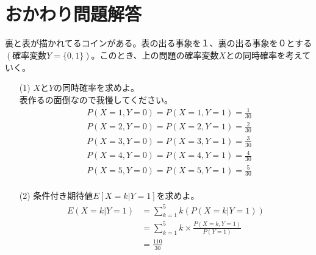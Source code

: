 \documentclass[a4j,uplatex]{jsarticle}
\begin{document}
\section*{おかわり問題解答}
裏と表が描かれてるコインがある。表の出る事象を１、裏の出る事象を０とする$(確率変数Y=\{ 0,1\})$。このとき、上の問題の確率変数$X$との同時確率を考えていく。
\begin{itemize}
  \item[(1)] $X$と$Y$の同時確率を求めよ。
  \\ 
  表作るの面倒なので我慢してください。
  \\
  \begin{equation}
    \begin{split}
      &P(X=1,Y=0)=P(X=1,Y=1)=\frac{1}{30}\\
      &P(X=2,Y=0)=P(X=2,Y=1)=\frac{2}{30}\\
      &P(X=3,Y=0)=P(X=3,Y=1)=\frac{3}{30}\\
      &P(X=4,Y=0)=P(X=4,Y=1)=\frac{4}{30}\\
      &P(X=5,Y=0)=P(X=5,Y=1)=\frac{5}{30}\\
    \end{split}
  \end{equation}
  \item[(2)] 条件付き期待値$E[X=k|Y=1]$を求めよ。
  \begin{equation}
    \begin{split}
      E(X=k|Y=1)&=\sum_{k=1}^5 k(P(X=k|Y=1))\\
      &=\sum_{k=1}^5 k\times \frac{P(X=k,Y=1)}{P(Y=1)}\\
      &=\frac{110}{30}
    \end{split}
  \end{equation} 
\end{itemize}
\end{document}
